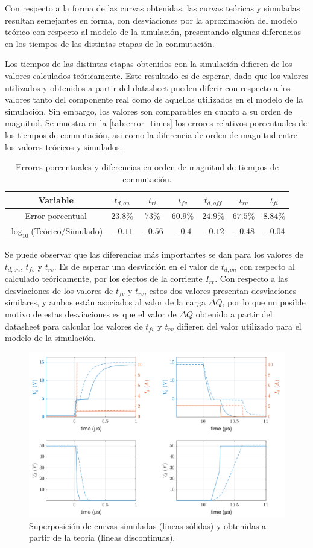 \documentclass[e4_tp1_main.tex]{subfiles}
\begin{document}
Con respecto a la forma de las curvas obtenidas, las curvas teóricas y simuladas resultan semejantes en forma, con desviaciones por la aproximación del modelo teórico con respecto al modelo de la simulación, presentando algunas diferencias en los tiempos de las distintas etapas de la conmutación. 


Los tiempos de las distintas etapas obtenidos con la simulación difieren de los valores calculados teóricamente. Este resultado es de esperar, dado que los valores utilizados y obtenidos a partir del datasheet pueden diferir con respecto a los valores tanto del componente real como de aquellos utilizados en el modelo de la simulación. Sin embargo, los valores son comparables en cuanto a su orden de magnitud. Se muestra en la \autoref{tab:error_times} los errores relativos porcentuales de los tiempos de conmutación, asi como la diferencia de orden de magnitud entre los valores teóricos y simulados.

\begin{table}[H]
\centering
\begin{tabular}{|c|c|c|c|c|c|c|}
\hline
Variable & $t_{d,on}$ & $t_{ri}$ & $t_{fv}$ & $t_{d,off}$ & $t_{rv}$ & $t_{fi}$  \\
\hline
Error porcentual & $23.8\% $ & $73\%$  & $60.9\%$  & $24.9\%$  & $67.5\%$  & $8.84\%$ \\
\hline
$\log_{10}$(Teórico/Simulado) & $-0.11$ & $-0.56$  & $-0.4$  & $-0.12$  & $-0.48$  & $-0.04$ \\
\hline
\end{tabular}	
\caption{Errores porcentuales y diferencias en orden de magnitud de tiempos de conmutación.}
\label{tab:error_times}
\end{table}

Se puede observar que las diferencias más importantes se dan para los valores de $t_{d,on}$, $t_{fv}$ y $t_{rv}$. Es de esperar una desviación en el valor de $t_{d,on}$ con respecto al calculado teóricamente, por los efectos de la corriente $I_{rr}$. Con respecto a las desviaciones de los valores de $t_{fv}$ y $t_{rv}$, estos dos valores presentan desviaciones similares, y ambos están asociados al valor de la carga $\Delta Q$, por lo que un posible motivo de estas desviaciones es que el valor de $\Delta Q$ obtenido a partir del datasheet para calcular los valores de $t_{fv}$ y $t_{rv}$ difieren del valor utilizado para el modelo de la simulación.
\begin{figure}[H]
  \centering
  \includegraphics[width=0.7\linewidth]{images/ej1/comparison.png}
  \caption{Superposición de curvas simuladas (lineas sólidas) y obtenidas a partir de la teoría (lineas discontinuas). }
  \label{fig:comparison}
\end{figure}
\end{document}
